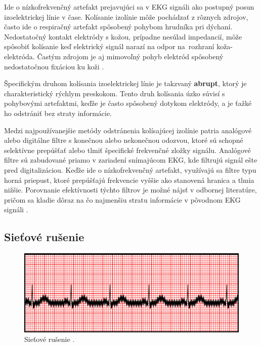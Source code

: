 Ide o nízkofrekvenčný artefakt prejavujúci sa v EKG signáli ako postupný posun izoelektrickej línie v čase. Kolísanie izolínie môže pochádzať z rôznych zdrojov, často ide o respiračný artefakt spôsobený pohybom hrudníka pri dýchaní. Nedostatočný kontakt elektródy s kožou, prípadne nesúlad impedancií, môže spôsobiť kolísanie keď elektrický signál narazí na odpor na~rozhraní koža-elektróda. Častým zdrojom je aj mimovoľný pohyb elektród spôsobený nedostatočnou fixáciou ku koži \cite{Romero2018}. 

Špecifickým druhom kolísania izoelektrickej línie je takzvaný \textbf{abrupt}, ktorý je charakteristický rýchlym preskokom. Tento druh kolísania úzko súvisí s pohybovými artefaktmi, keďže je často spôsobený dotykom elektródy, a je ťažké ho odstrániť bez straty informácie.

Medzi najpoužívanejšie metódy odstránenia kolísajúcej izolínie patria analógové alebo digitálne filtre s konečnou alebo nekonečnou odozvou, ktoré sú schopné selektívne prepúšťať alebo tlmiť špecifické frekvenčné zložky signálu. Analógové filtre sú zabudované priamo v zariadení snímajúcom EKG, kde filtrujú signál ešte pred digitalizáciou. Keďže ide o nízkofrekvenčný artefakt, využívajú sa filtre typu horná priepust, ktoré prepúšťajú frekvencie vyššie ako stanovená hranica a tlmia nižšie. Porovnanie efektívnosti týchto filtrov je možné nájsť v odbornej literatúre, pričom sa kladie dôraz na čo najmenšiu stratu informácie v pôvodnom EKG signáli \cite{Romero2018}\cite{Kaur2011}.

\subsection{Sieťové rušenie}

\begin{figure}[H]
    \centering
    \includegraphics[scale=0.7]{img/acinterference.jpg}
    \caption{Sieťové rušenie \cite{Mauvila_2018}.}
\end{figure}

